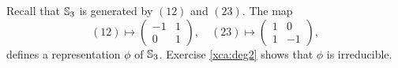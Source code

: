 \begin{example}
  Recall that $\mathbb{S}_3$ is generated by $(12)$ and $(23)$. The map 
  \[(12)\mapsto\begin{pmatrix}
    -1 & 1\\
    0 & 1
  \end{pmatrix},
  \quad
  (23)\mapsto\begin{pmatrix}
    1 & 0\\
    1 & -1
  \end{pmatrix},
  \]
  defines a representation $\phi$ of $\mathbb{S}_3$. 
  Exercise \ref{xca:deg2} shows that $\phi$ is  
  irreducible.
\end{example}